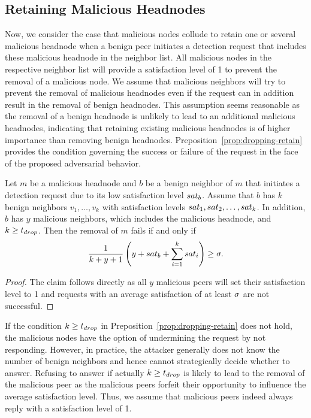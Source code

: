 \subsection{Retaining Malicious Headnodes}
Now, we consider the case that malicious nodes collude to retain one or several malicious headnode when a benign peer initiates a detection request that includes these malicious headnode in the neighbor list. 
All malicious nodes in the respective neighbor list will provide a satisfaction level of 1 to prevent the removal of a malicious node. We assume that malicious neighbors will try to prevent the removal of malicious headnodes even if the request can in addition result in the removal of benign headnodes. This assumption seems reasonable as the removal of a benign headnode is unlikely to lead to an additional malicious headnodes, indicating that retaining existing malicious headnodes is of higher importance than removing benign headnodes.  Preposition~\ref{prop:dropping-retain} provides the condition governing the success or failure of the \drop request in the face of the proposed adversarial behavior. 

\begin{proposition}
\label{prop:dropping-retain}
Let $m$ be a malicious headnode and $b$ be a benign neighbor of $m$ that initiates a detection request due to its low satisfaction level $sat_b$.
Assume that $b$ has $k$ benign neighbors $v_1, \ldots , v_k$ with satisfaction levels $sat_1, sat_2 ,\ldots  , sat_k$. In addition, $b$ has $y$ malicious neighbors, which includes the malicious headnode, and $k\geq t_{drop}$.
 Then the removal of $m$ fails if and only if 
\begin{align}
\label{eq:drop-retain}
\frac{1}{k+y+1}\left(y+\sat_b + \sum_{i=1}^k \sat_i\right) \geq \satThres.  
\end{align} 
\end{proposition}
\begin{proof}
The claim follows directly as all $y$ malicious peers will set their satisfaction level to 1 and \drop requests with an average satisfaction of at least $\sigma$ are not successful.   
\end{proof}
If the condition $k\geq t_{drop}$ in Preposition~\ref{prop:dropping-retain} does not hold, the malicious nodes have the option of undermining the request by not responding. However, in practice, the attacker generally does not know the number of benign neighbors and hence cannot strategically decide whether to answer. Refusing to answer if actually $k\geq t_{drop}$ is likely to lead to the removal of the malicious peer as the malicious peers forfeit their opportunity to influence the average satisfaction level. Thus, we assume that malicious peers indeed always reply with a satisfaction level of 1. 

